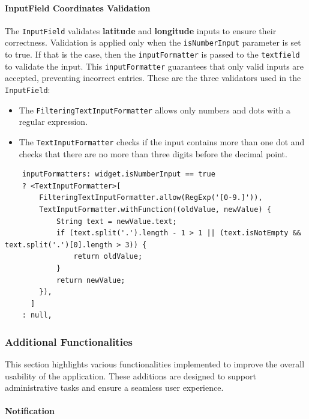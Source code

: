 \paragraph{InputField Coordinates Validation}
    The \texttt{InputField} validates \textbf{latitude} and \textbf{longitude} inputs to ensure their correctness. Validation is applied only when the \texttt{isNumberInput} parameter is set to true. If that is the case, then the \texttt{inputFormatter} is passed to the \texttt{textfield} to validate the input. This \texttt{inputFormatter} guarantees that only valid inputs are accepted, preventing incorrect entries. These are the three validators used in the \texttt{InputField}:

\begin{itemize}
    \item The \texttt{FilteringTextInputFormatter} allows only numbers and dots with a regular expression.
    \item The \texttt{TextInputFormatter} checks if the input contains more than one dot and checks that there are no more than three digits before the decimal point.
\end{itemize}

\lstset{style=mycsharp, caption=InputFormatter in Inputfield}
\begin{lstlisting}
    inputFormatters: widget.isNumberInput == true
    ? <TextInputFormatter>[
        FilteringTextInputFormatter.allow(RegExp('[0-9.]')),
        TextInputFormatter.withFunction((oldValue, newValue) {
            String text = newValue.text;
            if (text.split('.').length - 1 > 1 || (text.isNotEmpty && text.split('.')[0].length > 3)) {
                return oldValue;
            }
            return newValue;
        }),
      ]
    : null,
\end{lstlisting}
\newpage


\subsubsection{Additional Functionalities}
    This section highlights various functionalities implemented to improve the overall usability of the application. These additions are designed to support administrative tasks and ensure a seamless user experience.

\paragraph{Notification}
\label{fig:Notification}

